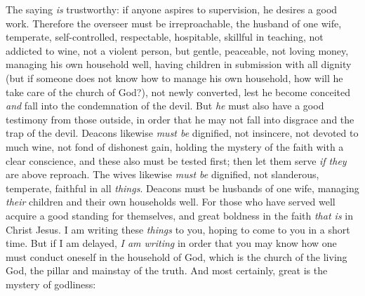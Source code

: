 \begin{biblechapter} %
 The saying \textit{is} trustworthy: if anyone aspires to supervision, he desires a good work.
\verse Therefore the overseer must be irreproachable, the husband of one wife, temperate, self-controlled, respectable, hospitable, skillful in teaching,
\verse not addicted to wine, not a violent person, but gentle, peaceable, not loving money,
\verse managing his own household well, having children in submission with all dignity
\verse (but if someone does not know how to manage his own household, how will he take care of the church of God?),
\verse not newly converted, lest he become conceited \textit{and} fall into the condemnation of the devil.
\verse But \textit{he} must also have a good testimony from those outside, in order that he may not fall into disgrace and the trap of the devil.
 Deacons likewise \textit{must be} dignified, not insincere, not devoted to much wine, not fond of dishonest gain,
\verse holding the mystery of the faith with a clear conscience,
\verse and these also must be tested first; then let them serve \textit{if they} are above reproach.
\verse The wives likewise \textit{must be} dignified, not slanderous, temperate, faithful in all \textit{things}.
\verse Deacons must be husbands of one wife, managing \textit{their} children and their own households well.
\verse For those who have served well acquire a good standing for themselves, and great boldness in the faith \textit{that is} in Christ Jesus.
 I am writing these \textit{things} to you, hoping to come to you in a short time.
\verse But if I am delayed, \textit{I am writing} in order that you may know how one must conduct oneself in the household of God, which is the church of the living God, the pillar and mainstay of the truth.
\verse And most certainly, great is the mystery of godliness:
\end{biblechapter}

